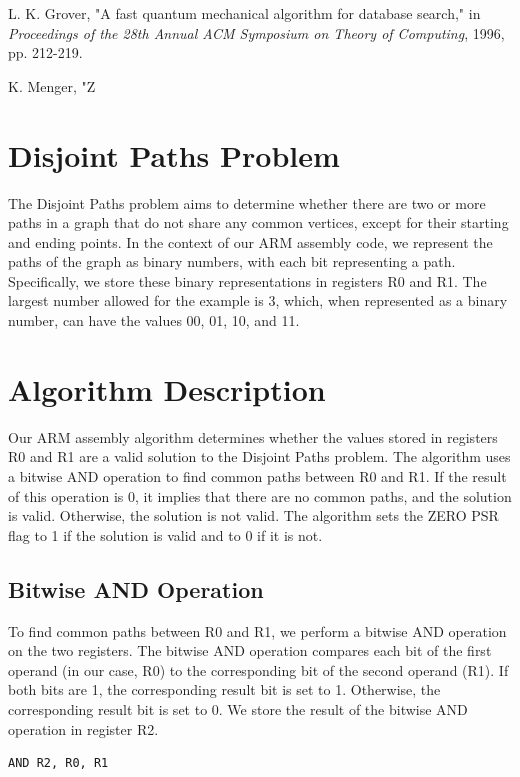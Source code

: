 \begin{thebibliography}{99}

L. K. Grover, "A fast quantum mechanical algorithm for database search," in \textit{Proceedings of the 28th Annual ACM Symposium on Theory of Computing}, 1996, pp. 212-219.

K. Menger, "Z

\section{Disjoint Paths Problem}
The Disjoint Paths problem aims to determine whether there are two or more paths in a graph that do not share any common vertices, except for their starting and ending points. In the context of our ARM assembly code, we represent the paths of the graph as binary numbers, with each bit representing a path. Specifically, we store these binary representations in registers R0 and R1. The largest number allowed for the example is 3, which, when represented as a binary number, can have the values 00, 01, 10, and 11.

\section{Algorithm Description}
Our ARM assembly algorithm determines whether the values stored in registers R0 and R1 are a valid solution to the Disjoint Paths problem. The algorithm uses a bitwise AND operation to find common paths between R0 and R1. If the result of this operation is 0, it implies that there are no common paths, and the solution is valid. Otherwise, the solution is not valid. The algorithm sets the ZERO PSR flag to 1 if the solution is valid and to 0 if it is not. 

\subsection{Bitwise AND Operation}
To find common paths between R0 and R1, we perform a bitwise AND operation on the two registers. The bitwise AND operation compares each bit of the first operand (in our case, R0) to the corresponding bit of the second operand (R1). If both bits are 1, the corresponding result bit is set to 1. Otherwise, the corresponding result bit is set to 0. We store the result of the bitwise AND operation in register R2.

\begin{verbatim}
AND R2, R0, R1
\end{verbatim}


\end{thebibliography}
